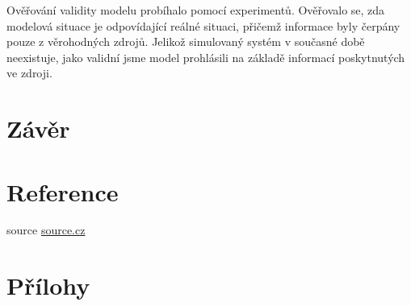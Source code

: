 \documentclass[11pt,a4paper]{report}
\begin{document}
      Ověřování validity modelu probíhalo pomocí experimentů. Ověřovalo se, zda
      modelová situace je odpovídající reálné situaci, přičemž informace byly
      čerpány pouze z věrohodných zdrojů. Jelikož simulovaný systém v současné
      době neexistuje, jako validní jsme model prohlásili na základě informací
      poskytnutých ve zdroji.

  \section{Závěr}



  \section{Reference}

    \begin{enumerate}[label={[\arabic*]}]
      \item source \href{source}{source.cz}
    \end{enumerate}

  \appendix
  \newpage

  \section{Přílohy}
\end{document}
